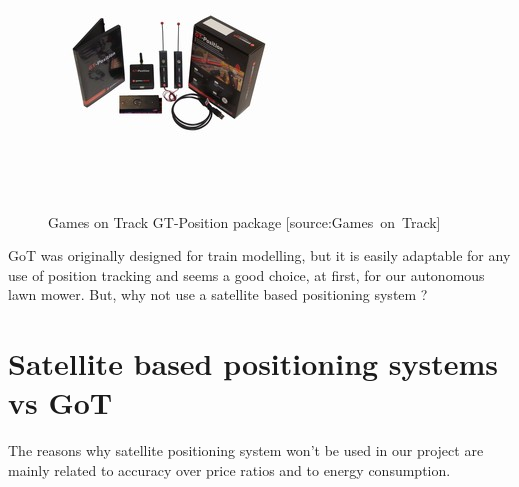 \begin{figure}[H]
\centering
\includegraphics[scale=1.1]{figures/gotSystem.jpg} 
\label{fig:gotsystem}
\caption{Games on Track GT-Position package [source:Games\ on\ Track]} 
\end{figure}
\noindent

GoT was originally designed for train modelling, but it is easily adaptable for any use of position tracking and seems a good choice, at first, for our autonomous lawn mower.
But, why not use a satellite based positioning system ?

\section{Satellite based positioning systems vs GoT}
The reasons why satellite positioning system won't be used in our project are mainly related to accuracy over price ratios and to energy consumption.

